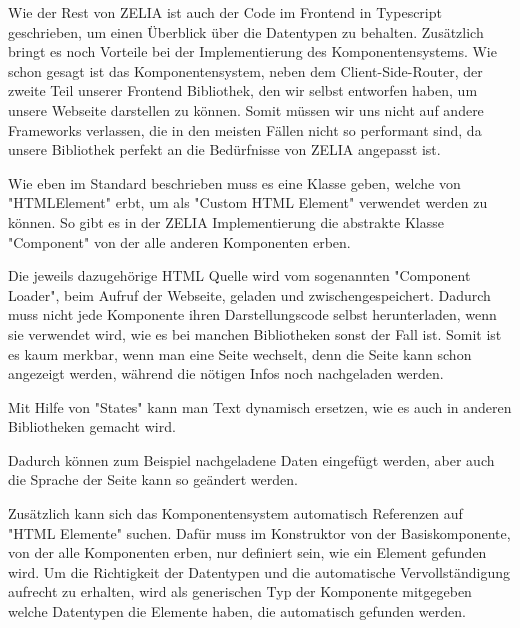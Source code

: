 


Wie der Rest von ZELIA ist auch der Code im Frontend in Typescript geschrieben, um einen Überblick über die Datentypen zu behalten. Zusätzlich bringt es noch Vorteile bei der Implementierung des Komponentensystems. Wie schon gesagt ist das Komponentensystem, neben dem Client-Side-Router, der zweite Teil unserer Frontend Bibliothek, den wir selbst entworfen haben, um unsere Webseite darstellen zu können. Somit müssen wir uns nicht auf andere Frameworks verlassen, die in den meisten Fällen nicht so performant sind, da unsere Bibliothek perfekt an die Bedürfnisse von ZELIA angepasst ist.


Wie eben im Standard beschrieben muss es eine Klasse geben, welche von "HTMLElement" erbt, um als "Custom HTML Element" verwendet werden zu können. So gibt es in der ZELIA Implementierung die abstrakte Klasse "Component" von der alle anderen Komponenten erben.


Die jeweils dazugehörige HTML Quelle wird vom sogenannten "Component Loader", beim Aufruf der Webseite, geladen und zwischengespeichert. Dadurch muss nicht jede Komponente ihren Darstellungscode selbst herunterladen, wenn sie verwendet wird, wie es bei manchen Bibliotheken sonst der Fall ist. Somit ist es kaum merkbar, wenn man eine Seite wechselt, denn die Seite kann schon angezeigt werden, während die nötigen Infos noch nachgeladen werden.

Mit Hilfe von "States" kann man Text dynamisch ersetzen, wie es auch in anderen Bibliotheken gemacht wird.



Dadurch können zum Beispiel nachgeladene Daten eingefügt werden, aber auch die Sprache der Seite kann so geändert werden.

Zusätzlich kann sich das Komponentensystem automatisch Referenzen auf "HTML Elemente" suchen. Dafür muss im Konstruktor von der Basiskomponente, von der alle Komponenten erben, nur definiert sein, wie ein Element gefunden wird. Um die Richtigkeit der Datentypen und die automatische Vervollständigung aufrecht zu erhalten, wird als generischen Typ der Komponente mitgegeben welche Datentypen die Elemente haben, die automatisch gefunden werden.

